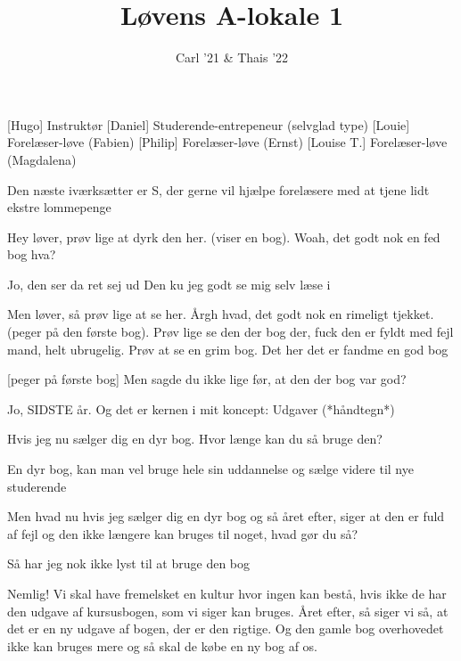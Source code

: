 \documentclass[a4paper,11pt]{article}
\title{Løvens A-lokale 1}
\author{Carl '21 \& Thais '22}
\begin{document}
\maketitle

\begin{roles}
[Hugo] Instruktør
[Daniel] Studerende-entrepeneur (selvglad type)
[Louie] Forelæser-løve (Fabien)
[Philip] Forelæser-løve (Ernst)
[Louise T.] Forelæser-løve (Magdalena)
\end{roles}

\begin{sketch}
 Den næste iværksætter er S, der gerne vil hjælpe forelæsere med at tjene lidt ekstre lommepenge

 Hey løver, prøv lige at dyrk den her. (viser en bog). Woah, det godt nok en fed bog hva?

 Jo, den ser da ret sej ud
 Den ku jeg godt se mig selv læse i

 Men løver, så prøv lige at se her. Årgh hvad, det godt nok en rimeligt tjekket. (peger på den første bog). Prøv lige se den der bog der, fuck den er fyldt med fejl mand, helt ubrugelig. Prøv at se en grim bog. Det her det er fandme en god bog


[peger på første bog] Men sagde du ikke lige før, at den der bog var god?

 Jo, SIDSTE år. Og det er kernen i mit koncept: Udgaver (*håndtegn*)


 Hvis jeg nu sælger dig en dyr bog. Hvor længe kan du så bruge den?

 En dyr bog, kan man vel bruge hele sin uddannelse og sælge videre til nye studerende

 Men hvad nu hvis jeg sælger dig en dyr bog og så året efter, siger at den er fuld af fejl og den ikke længere kan bruges til noget, hvad gør du så?

 Så har jeg nok ikke lyst til at bruge den bog

 Nemlig! Vi skal have fremelsket en kultur hvor ingen kan bestå, hvis ikke de har den udgave af kursusbogen, som vi siger kan bruges. Året efter, så siger vi så, at det er en ny udgave af bogen, der er den rigtige. Og den gamle bog overhovedet ikke kan bruges mere og så skal de købe en ny bog af os. 


\end{sketch}
\end{document}

